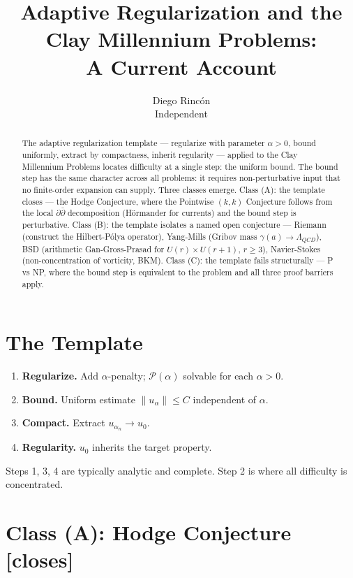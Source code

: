 \documentclass[12pt]{article}
\title{Adaptive Regularization and the Clay Millennium Problems:\\
A Current Account}
\author{Diego Rinc\'on \\ \small Independent}
\date{}
\theoremstyle{remark}
\begin{document}
\maketitle

\begin{abstract}
The adaptive regularization template --- regularize with parameter $\alpha>0$,
bound uniformly, extract by compactness, inherit regularity --- applied to the
Clay Millennium Problems locates difficulty at a single step: the uniform bound.
The bound step has the same character across all problems: it requires
non-perturbative input that no finite-order expansion can supply. Three classes
emerge. Class (A): the template closes --- the Hodge Conjecture, where the
Pointwise $(k,k)$ Conjecture follows from the local $\partial\bar\partial$
decomposition (Hörmander for currents) and the bound step is perturbative.
Class (B): the template isolates a named open conjecture --- Riemann (construct
the Hilbert-Pólya operator), Yang-Mills (Gribov mass $\gamma(a)\to\Lambda_{QCD}$),
BSD (arithmetic Gan-Gross-Prasad for $U(r)\times U(r+1)$, $r\geq 3$),
Navier-Stokes (non-concentration of vorticity, BKM).
Class (C): the template fails structurally --- P vs NP, where the bound step
is equivalent to the problem and all three proof barriers apply.
\end{abstract}

\section{The Template}

\begin{enumerate}
\item \textbf{Regularize.} Add $\alpha$-penalty; $\mathcal{P}(\alpha)$ solvable
  for each $\alpha>0$.
\item \textbf{Bound.} Uniform estimate $\|u_\alpha\|\leq C$ independent of $\alpha$.
\item \textbf{Compact.} Extract $u_{\alpha_n}\to u_0$.
\item \textbf{Regularity.} $u_0$ inherits the target property.
\end{enumerate}
Steps 1, 3, 4 are typically analytic and complete. Step 2 is where all
difficulty is concentrated.

\section{Class (A): Hodge Conjecture \textnormal{[closes]}}
\end{document}
